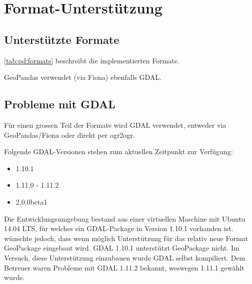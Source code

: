 \section{Format-Unterstützung}
\subsection{Unterstützte Formate}
\cref{tab:pd:formats} beschreibt die implementierten Formate.


GeoPandas verwendet (via Fiona) ebenfalls GDAL.

\subsection{Probleme mit GDAL}\label{sec:pd:format-gdal-problems}
Für einen grossen Teil der Formate wird GDAL verwendet, entweder via GeoPandas/Fiona oder direkt per ogr2ogr. 

Folgende GDAL-Versionen stehen zum aktuellen Zeitpunkt zur Verfügung:
\begin{itemize}
\item 1.10.1
\item 1.11.0 - 1.11.2
\item 2.0.0beta1
\end{itemize}

Die Entwicklungsumgebung bestand aus einer virtuellen Maschine mit Ubuntu 14.04 LTS, für welches ein GDAL-Package in Version 1.10.1 vorhanden ist. \proff wünschte jedoch, dass wenn möglich Unterstützung für das relativ neue Format GeoPackage eingebaut wird. GDAL 1.10.1 unterstützt GeoPackage nicht. Im Versuch, diese Unterstützung einzubauen wurde GDAL selbst kompiliert. Dem Betreuer waren Probleme mit GDAL 1.11.2 bekannt, weswegen 1.11.1 gewählt wurde.

